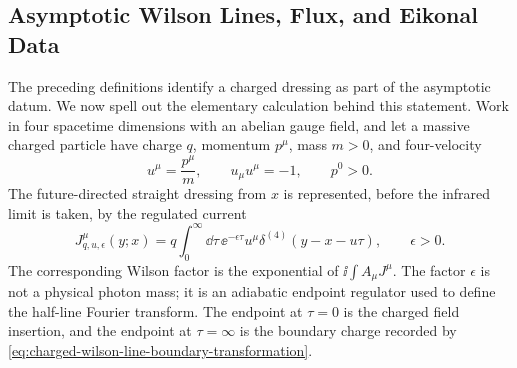 \subsection{Asymptotic Wilson Lines, Flux, and Eikonal Data}

The preceding definitions identify a charged dressing as part of the
asymptotic datum.  We now spell out the elementary calculation behind this
statement.  Work in four spacetime dimensions with an abelian gauge field, and
let a massive charged particle have charge \(q\), momentum \(p^\mu\), mass
\(m>0\), and four-velocity
\[
  u^\mu=\frac{p^\mu}{m},
  \qquad u_\mu u^\mu=-1,
  \qquad p^0>0 .
\]
The future-directed straight dressing from \(x\) is represented, before the
infrared limit is taken, by the regulated current
\begin{equation}
  J_{q,u,\epsilon}^\mu(y;x)
  =
  q\int_0^\infty \dd\tau\,
  \ee^{-\epsilon\tau}u^\mu
  \delta^{(4)}(y-x-u\tau),
  \qquad \epsilon>0 .
  \label{eq:regulated-asymptotic-worldline-current}
\end{equation}
The corresponding Wilson factor is the exponential of
\(\ii\int A_\mu J^\mu\).  The factor \(\epsilon\) is not a physical photon
mass; it is an adiabatic endpoint regulator used to define the half-line
Fourier transform.  The endpoint at \(\tau=0\) is the charged field insertion,
and the endpoint at \(\tau=\infty\) is the boundary charge recorded by
\eqref{eq:charged-wilson-line-boundary-transformation}.

